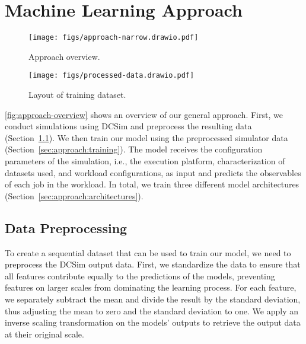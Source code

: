\section{Machine Learning Approach}
\label{sec:approach}

\begin{figure}
\begin{minipage}[b]{0.54\linewidth}
    \centering
    \texttt{[image: figs/approach-narrow.drawio.pdf]}
    \caption{Approach overview.}
    \label{fig:approach-overview}
\end{minipage}
\hfill
\begin{minipage}[b]{0.44\linewidth}
\centering
    \texttt{[image: figs/processed-data.drawio.pdf]}
    \caption{Layout of training dataset.}
    \label{fig:approach-data}
\end{minipage}
\end{figure}

\autoref{fig:approach-overview} shows an overview of our general approach. 
%
First, we conduct simulations using DCSim and preprocess the resulting data (Section~\ref{sec:approach:preprocessing}). %
%
We then train our model using the preprocessed simulator data (Section~\ref{sec:approach:training}). The model receives the configuration parameters of the simulation, i.e., the execution platform, characterization of datasets used, and workload configurations, as input and predicts the observables of each job in the workload. 
%
In total, we train three different model architectures (Section~\ref{sec:approach:architectures}). 
%

\subsection{Data Preprocessing} \label{sec:approach:preprocessing}
To create a sequential dataset that can be used to train our model, we need to preprocess the DCSim output data. 
%
First, we standardize the data to ensure that all features contribute equally to the predictions of the models, preventing features on larger scales from dominating the learning process. %
%
For each feature, we separately subtract the mean and divide the result by the standard deviation, thus adjusting the mean to zero and the standard deviation to one. 
%
%
We apply an inverse scaling transformation on the models' outputs to retrieve the output data at their original scale. 

